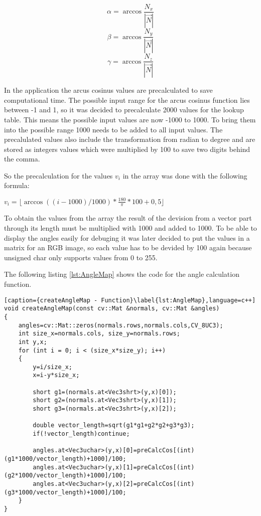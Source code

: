 $$ \alpha = \arccos \frac{N_x}{\left|\vec{N}\right|}  $$
$$ \beta  = \arccos \frac{N_y}{\left|\vec{N}\right|}  $$
$$ \gamma = \arccos \frac{N_z}{\left|\vec{N}\right|}  $$

In the application the arcus cosinus values are precalculated to save computational time.
The possible input range for the arcus cosinus function lies between -1 and 1, so it was decided
to precalculate 2000 values for the lookup table. This means the possible input values are now
-1000 to 1000. To bring them into the possible range 1000 needs to be added to all input values.
The precalulated values also include the transformation from radian to degree and are stored as 
integers values which were multiplied by 100 to save two digits behind the comma.

So the precalculation for the values $v_i$ in the array was done with the following formula:

$v_i=\lfloor \arccos ((i-1000)/1000) * \frac{180}{\pi}*100 + 0,5 \rfloor$

To obtain the values from the array the result of the devision from a vector part through its length
must be multiplied with 1000 and added to 1000. To be able to display the angles easily for debuging 
it was later decided to put the values in a matrix for an RGB image, so each value has to be devided 
by 100 again because unsigned char only supports values from 0 to 255.

The following listing \vref{lst:AngleMap} shows the code for the angle calculation function.

\begin{lstlisting}[caption={createAngleMap - Function}\label{lst:AngleMap},language=c++]
void createAngleMap(const cv::Mat &normals, cv::Mat &angles)
{
	angles=cv::Mat::zeros(normals.rows,normals.cols,CV_8UC3);
	int size_x=normals.cols, size_y=normals.rows;
	int y,x;
	for (int i = 0; i < (size_x*size_y); i++)
	{ 
		y=i/size_x;
		x=i-y*size_x;

		short g1=(normals.at<Vec3shrt>(y,x)[0]);
		short g2=(normals.at<Vec3shrt>(y,x)[1]);
		short g3=(normals.at<Vec3shrt>(y,x)[2]);

		double vector_length=sqrt(g1*g1+g2*g2+g3*g3);
		if(!vector_length)continue;

		angles.at<Vec3uchar>(y,x)[0]=preCalcCos[(int)(g1*1000/vector_length)+1000]/100;
		angles.at<Vec3uchar>(y,x)[1]=preCalcCos[(int)(g2*1000/vector_length)+1000]/100;
		angles.at<Vec3uchar>(y,x)[2]=preCalcCos[(int)(g3*1000/vector_length)+1000]/100;
	}
}	
\end{lstlisting}

